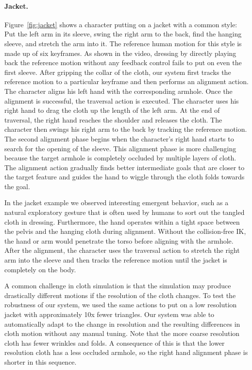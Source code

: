 \paragraph{Jacket.} Figure~\ref{fig:jacket} shows a character putting on a jacket with a common style: Put the left arm in its sleeve, swing the right arm to the back, find the hanging sleeve, and stretch the arm into it. The reference human motion for this style is made up of six keyframes. As shown in the video, dressing by directly playing back the reference motion without any feedback control fails to put on even the first sleeve. After gripping the collar of the cloth, our system first tracks the reference motion to a particular keyframe and then performs an alignment action. The character aligns his left hand with the corresponding armhole. Once the alignment is successful, the traversal action is executed. The character uses his right hand to drag the cloth up the length of the left arm. At the end of traversal, the right hand reaches the shoulder and releases the cloth. The character then swings his right arm to the back by tracking the reference motion. The second alignment phase begins when the character's right hand starts to search for the opening of the sleeve. This alignment phase is more challenging because the target armhole is completely occluded by multiple layers of cloth. The alignment action gradually finds better intermediate goals that are closer to the target feature and guides the hand to wiggle through the cloth folds towards the goal. 

In the jacket example we observed interesting emergent behavior, such as a natural exploratory gesture that is often used by humans to sort out the tangled cloth in dressing. Furthermore, the hand operates within a tight space between the pelvis and the hanging cloth during alignment. Without the collision-free IK, the hand or arm would penetrate the torso before aligning with the armhole. After the alignment, the character uses the traversal action to stretch the right arm into the sleeve and then tracks the reference motion until the jacket is completely on the body. 

A common challenge in cloth simulation is that the simulation may produce
drastically different motions if the resolution of the cloth changes. To
test the robustness of our system, we used the same actions to put on a
low resolution jacket with approximately 10x fewer triangles. Our system
was able to automatically adapt to the change in resolution and the
resulting differences in cloth motion without any manual tuning. Note that
the more coarse resolution cloth has fewer wrinkles and folds.  A
consequence of this is that the lower resolution cloth has a less occluded
armhole, so the right hand alignment phase is shorter in this sequence.

